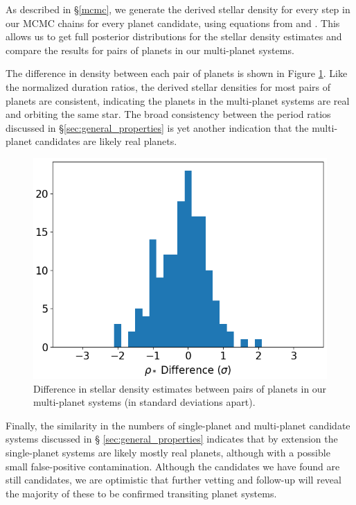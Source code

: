 \documentclass[twocolumn]{aastex62}
\begin{document}
As described in \S\ref{mcmc}, we generate the derived stellar density
for every step in our MCMC chains for every planet candidate, using
equations from \cite{win10} and \cite{sea03}. This allows us to get
full posterior distributions for the stellar density estimates and
compare the results for pairs of planets in our multi-planet systems.

The difference in density between each pair of planets is shown in
Figure \ref{normed_density}.  Like the normalized duration ratios, the
derived stellar densities for most pairs of planets are consistent,
indicating the planets in the multi-planet systems are real and
orbiting the same star.  The broad consistency between the period
ratios discussed in \S \ref{sec:general_properties} is yet another
indication that the multi-planet candidates are likely real planets.

\begin{figure}[tbp]
\includegraphics[width=\columnwidth]{normed_density.png}
\caption{Difference in stellar density estimates between pairs of
  planets in our multi-planet systems (in standard deviations apart).
\label{normed_density}}
\end{figure}

Finally, the similarity in the numbers of single-planet and
multi-planet candidate systems discussed in \S
\ref{sec:general_properties} indicates that by extension the
single-planet systems are likely mostly real planets, although with a
possible small false-positive contamination.  Although the candidates
we have found are still candidates, we are optimistic that further
vetting and follow-up will reveal the majority of these to be
confirmed transiting planet systems.
\end{document}
